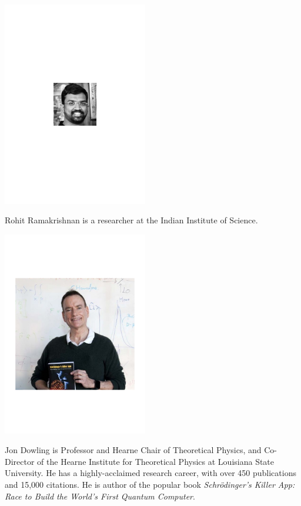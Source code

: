 
%
%

\begin{center}
\includegraphics[clip=true, width=0.475\textwidth]{photo_rohit_ramakrishnan}
\end{center}

Rohit Ramakrishnan is a researcher at the Indian Institute of Science.


%
%

\begin{center}
\includegraphics[clip=true, width=0.475\textwidth]{photo_jon_dowling}
\end{center}

Jon Dowling is Professor and Hearne Chair of Theoretical Physics, and Co-Director of the Hearne Institute for Theoretical Physics at Louisiana State University. He has a highly-acclaimed research career, with over 450 publications and 15,000 citations. He is author of the popular book \textit{Schr\"odinger's Killer App: Race to Build the World's First Quantum Computer}.

